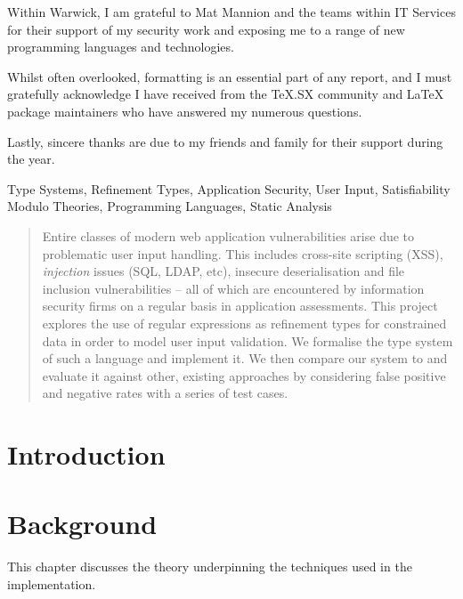 \documentclass[a4paper,openany,12pt]{book}
\begin{document}
Within Warwick, I am grateful to Mat Mannion and the teams within IT Services for their support of
my security work and exposing me to a range of new programming languages and technologies.

Whilst often overlooked, formatting is an essential part of any report, and I must gratefully acknowledge I have
received from the TeX.SX community and \LaTeX{} package maintainers who have answered my numerous questions.

Lastly, sincere thanks are due to my friends and family for their support during the year.

\pagebreak[5]
\begin{keywords}
    Type Systems, Refinement Types, Application Security, User Input, Satisfiability Modulo Theories,
    Programming Languages, Static Analysis
\end{keywords}

\vspace{0.5em}

\begin{abstract}
    Entire classes of modern web application vulnerabilities arise due to problematic user input handling.
    This includes cross-site scripting (XSS), \emph{injection} issues (SQL, LDAP, etc), insecure deserialisation and
    file inclusion vulnerabilities – all of which are encountered by information security firms on a regular basis in application assessments.
    This project explores the use of regular expressions as refinement types for constrained data in order to model user input validation.
    We formalise the type system of such a language and implement it.
    We then compare our system to and evaluate it against other, existing approaches by considering false positive and negative rates with a series of test cases.
\end{abstract}
\titlespacing*{\chapter}
{0pt}{0pt}{2.0ex}

\chapter{Introduction}

\chapter{Background}
This chapter discusses the theory underpinning the techniques used in the implementation.
\end{document}
